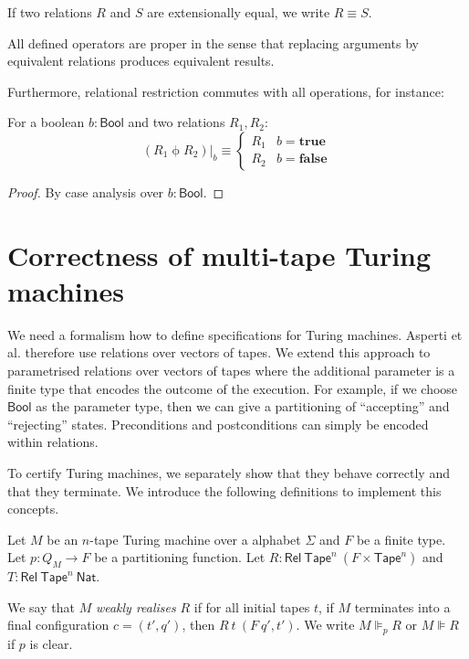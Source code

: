 \documentclass{psartcl}
\newcommand{\MS}[1]{\textsf{#1}}
\newcommand{\from}{:}
\renewcommand{\to}{\rightarrow}
\newcommand{\Bool}{\MS{Bool}}
\newcommand{\Nat}{\MS{Nat}}
\newcommand{\true}{\mathbf{true}}
\newcommand{\false}{\mathbf{false}}
\newcommand{\Rel}{\mathsf{Rel}}
\newcommand{\Tape}{\MS{Tape}}
\newcommand{\Tapes}[1]{\Tape^{#1}}
\newcommand{\rif}{\mathbin{\phi}}
\newcommand{\at}[2][]{#1|_{#2}}
\begin{document}

If two relations $R$ and $S$ are extensionally equal, we write $R \equiv S$.

All defined operators are proper in the sense that replacing arguments by equivalent relations produces equivalent results.

Furthermore, relational restriction commutes with all operations, for instance:

\begin{lemma}
  For a boolean $b:\Bool$ and two relations $R_1, R_2$:
  $$(R_1 \rif R_2)\at{b} \equiv
  \begin{cases}
    R_1 & b = \true \\
    R_2 & b = \false
  \end{cases} $$
\end{lemma}
\begin{proof}
  By case analysis over $b:\Bool$.
\end{proof}



\section{Correctness of multi-tape Turing machines}
\label{sec:verification}

We need a formalism how to define specifications for Turing machines.  Asperti et al. therefore use relations over vectors of tapes.  We extend this
approach to parametrised relations over vectors of tapes where the additional parameter is a finite type that encodes the outcome of the execution.
For example, if we choose $\Bool$ as the parameter type, then we can give a partitioning of ``accepting'' and ``rejecting'' states.  Preconditions and
postconditions can simply be encoded within relations.

To certify Turing machines, we separately show that they behave correctly and that they terminate.
We introduce the following definitions to implement this concepts.

Let $M$ be an $n$-tape Turing machine over a alphabet $\Sigma$ and $F$ be a finite type.
Let $p \from Q_M \to F$ be a partitioning function.
Let $R:\Rel~\Tapes{n}~(F \times \Tapes{n})$ and $T:\Rel~\Tapes{n}~\Nat$.

\begin{definition}
  \label{def:wrealise}
  We say that $M$ \emph{weakly realises} $R$ if for all initial tapes $t$, if $M$ terminates into a final configuration $c=(t', q')$, then
  $R~t~(F~q', t')$.
  We write $M \VDash_p R$ or $M \VDash R$ if $p$ is clear.
\end{definition}
\end{document}

